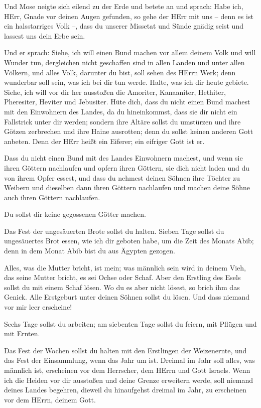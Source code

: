  Und Mose neigte sich eilend zu der Erde und betete an
 und sprach: Habe ich, HErr, Gnade vor deinen Augen
gefunden, so gehe der HErr mit uns -- denn es ist ein halsstarriges Volk
--, dass du unserer Missetat und Sünde gnädig seist und lassest uns dein
Erbe sein.

 Und er sprach: Siehe, ich will einen Bund machen vor allem
deinem Volk und will Wunder tun, dergleichen nicht geschaffen sind in
allen Landen und unter allen Völkern, und alles Volk, darunter du bist,
soll sehen des HErrn Werk; denn wunderbar soll sein, was ich bei dir tun
werde.  Halte, was ich dir heute gebiete. Siehe, ich will
vor dir her ausstoßen die Amoriter, Kanaaniter, Hethiter, Pheresiter,
Heviter und Jebusiter.  Hüte dich, dass du nicht einen Bund
machest mit den Einwohnern des Landes, da du hineinkommst, dass sie dir
nicht ein Fallstrick unter dir werden;  sondern ihre Altäre
sollst du umstürzen und ihre Götzen zerbrechen und ihre Haine ausrotten;
 denn du sollst keinen anderen Gott anbeten. Denn der HErr
heißt ein Eiferer; ein eifriger Gott ist er.

 Dass du nicht einen Bund mit des Landes Einwohnern
machest, und wenn sie ihren Göttern nachlaufen und opfern ihren Göttern,
sie dich nicht laden und du von ihrem Opfer essest,  und
dass du nehmest deinen Söhnen ihre Töchter zu Weibern und dieselben dann
ihren Göttern nachlaufen und machen deine Söhne auch ihren Göttern
nachlaufen.

 Du sollst dir keine gegossenen Götter machen.

 Das Fest der ungesäuerten Brote sollst du halten. Sieben
Tage sollst du ungesäuertes Brot essen, wie ich dir geboten habe, um die
Zeit des Monats Abib; denn in dem Monat Abib bist du aus Ägypten
gezogen.

 Alles, was die Mutter bricht, ist mein; was männlich sein
wird in deinem Vieh, das seine Mutter bricht, es sei Ochse oder Schaf.
 Aber den Erstling des Esels sollst du mit einem Schaf
lösen. Wo du es aber nicht lösest, so brich ihm das Genick. Alle
Erstgeburt unter deinen Söhnen sollst du lösen. Und dass niemand vor mir
leer erscheine!

 Sechs Tage sollst du arbeiten; am siebenten Tage sollst du
feiern, mit Pflügen und mit Ernten.

 Das Fest der Wochen sollst du halten mit den Erstlingen
der Weizenernte, und das Fest der Einsammlung, wenn das Jahr um ist.
 Dreimal im Jahr soll alles, was männlich ist, erscheinen
vor dem Herrscher, dem HErrn und Gott Israels.  Wenn ich
die Heiden vor dir ausstoßen und deine Grenze erweitern werde, soll
niemand deines Landes begehren, dieweil du hinaufgehst dreimal im Jahr,
zu erscheinen vor dem HErrn, deinem Gott.

